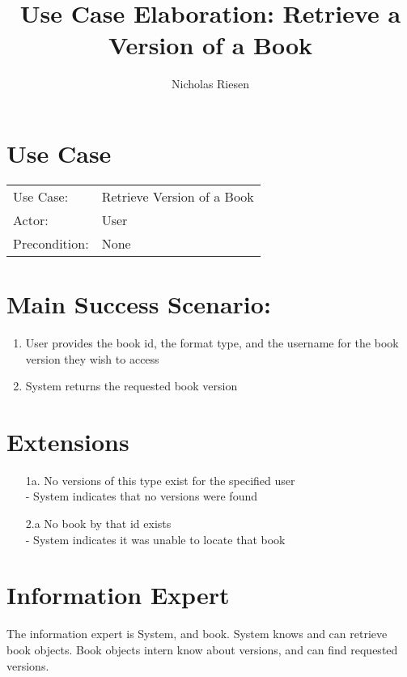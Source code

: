 \documentclass{article}
\title{Use Case Elaboration: Retrieve a Version of a Book}
\author{ Nicholas Riesen }
\begin{document}
\maketitle


\section*{Use Case}
\begin{tabular}{l l}
Use Case:     & Retrieve Version of a Book  \\
Actor:        & User                         \\
Precondition: & None                         \\
\end{tabular}


\section*{Main Success Scenario:}

\begin{enumerate}
    \item User provides the book id, the format type, and the username for the book version they wish to access
    \item System returns the requested book version
 
\end{enumerate}

\section*{Extensions}

\begin{itemize}
    \item [1a.] No versions of this type exist for the specified user \\
         - System indicates that no versions were found
    \item [2.a] No book by that id exists \\
        - System indicates it was unable to locate that book
\end{itemize}


\section*{Information Expert}
The information expert is System, and book. System knows and can retrieve book objects. Book objects intern know about versions, and can find requested versions. 
\end{document}
